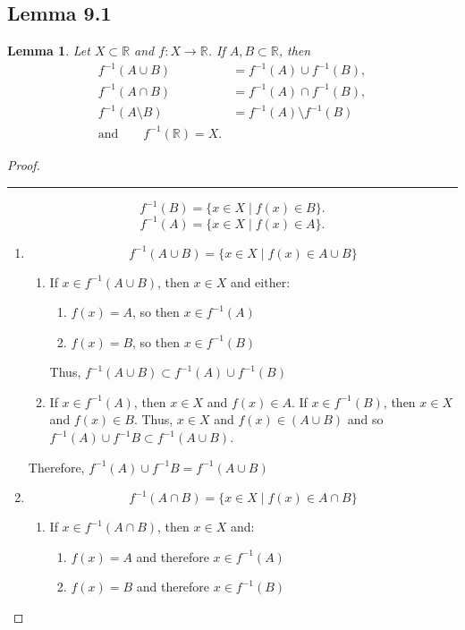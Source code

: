 \documentclass[openany, amssymb, psamsfonts]{amsart}
\newcommand{\bbR}{\mathbb{R}}
\newcommand{\sm}{\setminus}
\newcommand{\arr}{\longrightarrow}
\newtheorem{lem}{Lemma}[section]
\theoremstyle{definition}
\numberwithin{equation}{section}
\begin{document}
\subsection*{Lemma 9.1}
\begin{lem}
\label{9.1}
Let $X\subset \bbR$ and $f\colon X\arr \bbR$.
If $A, B \subset \bbR$,  then
\begin{align*}
f^{-1}(A\cup B) &= f^{-1}(A) \cup f^{-1}(B),\\
f^{-1}(A\cap B) &= f^{-1}(A) \cap f^{-1}(B),\\
 f^{-1}(A\sm B) & = f^{-1}(A)\sm f^{-1}(B)\\
 \text{and}\qquad f^{-1}(\bbR)=X.
\end{align*}
\end{lem}
\begin{proof} \vspace{4pt}     \hrule   \vspace{4pt}
\[
f^{-1}(B) = \{ x \in X \mid f(x) \in B \}.
\]
\[
f^{-1}(A) = \{ x \in X \mid f(x) \in A \}.
\]
\begin{enumerate}
    \item 
    \[f^{-1}(A\cup B) = \{ x \in X \mid f(x) \in A \cup B\}\]
    \begin{enumerate}
        \item If $x\in f^{-1}(A\cup B)$, then $x\in X$ and either:
        \begin{enumerate}
            \item $f(x) = A$, so then $x\in f^{-1}(A)$
            \item $f(x) = B$, so then $x\in f^{-1}(B)$
        \end{enumerate} 
        Thus, $f^{-1}(A\cup B) \subset f^{-1}(A)\cup f^{-1}(B)$
        \item If $x\in f^{-1}(A)$, then $x\in X$ and $f(x) \in A$. If $x\in f^{-1}(B)$, then $x\in X$ and $f(x) \in B$. Thus, $x\in X$ and $f(x) \in (A\cup B)$ and so $f^{-1}(A)\cup f^{-1}B \subset f^{-1}(A\cup B)$.
    \end{enumerate}
    Therefore, $f^{-1}(A)\cup f^{-1}B = f^{-1}(A\cup B)$
    \item \[f^{-1}(A\cap B) = \{ x \in X \mid f(x) \in A \cap B\}\]
    \begin{enumerate}
        \item If $x\in f^{-1}(A\cap B)$, then $x\in X$ and:
        \begin{enumerate}
            \item $f(x) = A$ and therefore $x\in f^{-1}(A)$
            \item $f(x) = B$ and therefore $x\in f^{-1}(B)$

\end{enumerate}
\end{enumerate}
\end{enumerate}
\end{proof}
\end{document}
